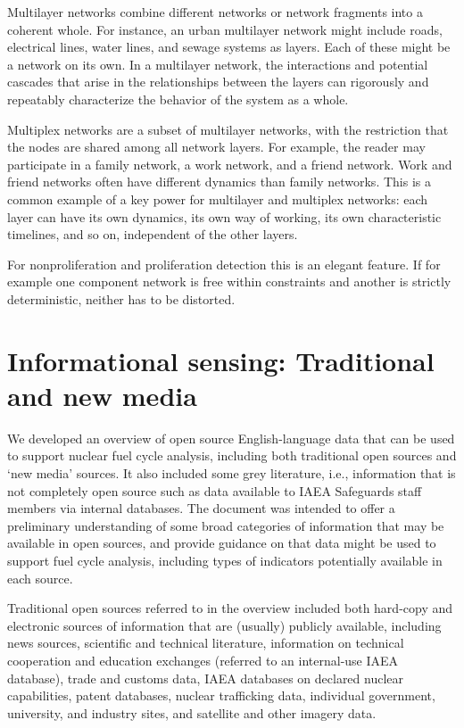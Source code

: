 \documentclass{article} %
\begin{document}
Multilayer networks combine different networks or network fragments into a coherent whole. For instance, an urban multilayer network might include roads, electrical lines, water lines, and sewage systems as layers. Each of these might be a network on its own. In a multilayer network, the interactions and potential cascades that arise in the relationships between the layers can rigorously and repeatably characterize the behavior of the system as a whole.

Multiplex networks are a subset of multilayer networks, with the restriction that the nodes are shared among all network layers. For example, the reader may participate in a family network, a work network, and a friend network. Work and friend networks often have different dynamics than  family networks. This is a common example of a key power for multilayer and multiplex networks: each layer can have its own dynamics, its own way of working, its own characteristic timelines, and so on, independent of the other layers.

For nonproliferation and proliferation detection this is an elegant feature. If for example one component network is free within constraints and another is strictly deterministic, neither has to be distorted.  

\newpage
\thispagestyle{empty}
\mbox{}
\newpage

\section{Informational sensing: Traditional and new media}
We developed an overview of open source English-language data that can be used to support nuclear fuel cycle analysis, including both traditional open sources and `new media' sources. It also included some grey literature, i.e., information that is not completely open source such as data available to IAEA Safeguards staff members via internal databases. The document was intended to offer a preliminary understanding of some broad categories of information that may be available in open sources, and provide guidance on that data might be used to support fuel cycle analysis, including types of indicators potentially available in each source.

Traditional open sources referred to in the overview included both hard-copy and electronic sources of information that are (usually) publicly available, including news sources, scientific and technical literature, information on technical cooperation and education exchanges (referred to an internal-use IAEA database), trade and customs data, IAEA databases on declared nuclear capabilities, patent databases, nuclear trafficking data, individual government, university, and industry sites, and satellite and other imagery data. 
\end{document}

